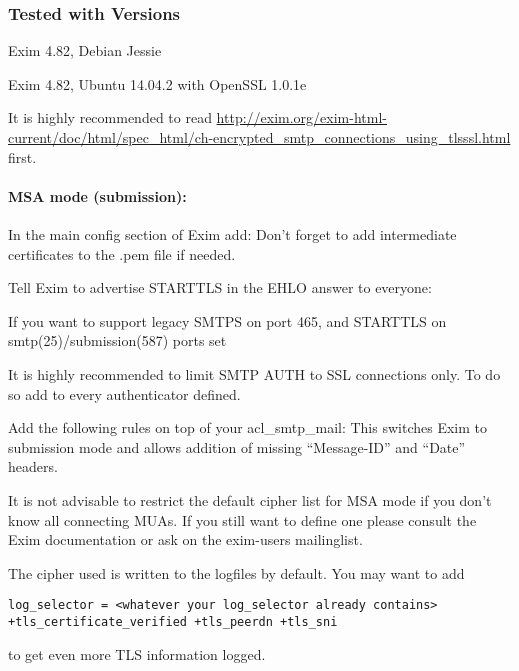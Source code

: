 \subsubsection{Tested with Versions}
\begin{itemize*}
  \item Exim 4.82, Debian Jessie
  \item Exim 4.82, Ubuntu 14.04.2 with OpenSSL 1.0.1e
\end{itemize*}


It is highly recommended to read
\url{http://exim.org/exim-html-current/doc/html/spec_html/ch-encrypted_smtp_connections_using_tlsssl.html}
first.

\paragraph{MSA mode (submission):}
In the main config section of Exim add:
Don't forget to add intermediate certificates to the .pem file if needed.

Tell Exim to advertise STARTTLS in the EHLO answer to everyone:

If you want to support legacy SMTPS on port 465, and STARTTLS on smtp(25)/submission(587) ports set

It is highly recommended to limit SMTP AUTH to SSL connections only. To do so add
to every authenticator defined.

Add the following rules on top of your acl\_smtp\_mail:
This switches Exim to submission mode and allows addition of missing ``Message-ID'' and ``Date'' headers.

It is not advisable to restrict the default cipher list for MSA mode if you don't know all connecting MUAs. If you still want to define one please consult the Exim documentation or ask on the exim-users mailinglist.

The cipher used is written to the logfiles by default. You may want to add
\begin{lstlisting}
log_selector = <whatever your log_selector already contains> +tls_certificate_verified +tls_peerdn +tls_sni
\end{lstlisting}
to get even more TLS information logged.


